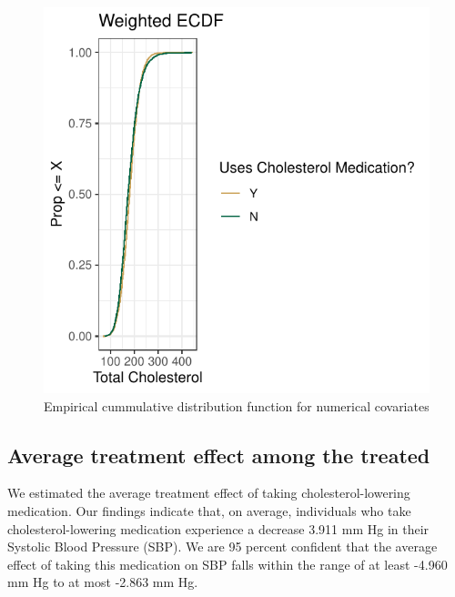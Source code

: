 \documentclass[useAMS,usenatbib,referee]{biom}
\begin{document}
\begin{figure}
\centering
\includegraphics{final-project_files/figure-latex/fig_ecdf-1.pdf}
\caption{Empirical cummulative distribution function for numerical
covariates}
\end{figure}

\hypertarget{average-treatment-effect-among-the-treated}{%
\subsection{Average treatment effect among the
treated}\label{average-treatment-effect-among-the-treated}}

We estimated the average treatment effect of taking cholesterol-lowering
medication. Our findings indicate that, on average, individuals who take
cholesterol-lowering medication experience a decrease 3.911 mm Hg in
their Systolic Blood Pressure (SBP). We are 95 percent confident that
the average effect of taking this medication on SBP falls within the
range of at least -4.960 mm Hg to at most -2.863 mm Hg.
\end{document}

